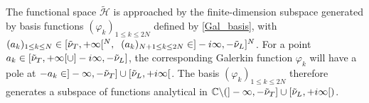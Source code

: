 The functional space $\tilde{\mathcal{H}}$ is approached by the finite-dimension subspace generated by basis functions $(\varphi_k)_{1 \leq k \leq 2N}$ defined by \eqref{Gal_basis}, with $(a_k)_{1 \leq k \leq N} \in \lbrack \tilde{\nu}_T, + \infty \lbrack^N ,\; \; (a_k)_{N+1\leq k \leq 2N} \in \rbrack -i\infty, -\tilde{\nu}_L\rbrack^N$. For a point $a_k \in \lbrack \tilde{\nu}_T, + \infty \lbrack \cup \rbrack -i\infty, -\tilde{\nu}_L\rbrack$, the corresponding Galerkin function $\varphi_k$ will have a pole at $-a_k \in \rbrack-\infty,-\tilde{\nu}_T\rbrack \cup \lbrack \tilde{\nu}_L,+i\infty\lbrack$. The basis $(\varphi_k)_{1 \leq k \leq 2N}$ therefore generates a subspace of functions analytical in $\mathbb{C} \backslash ( \rbrack-\infty,-\tilde{\nu}_T\rbrack \cup \lbrack \tilde{\nu}_L,+i\infty\lbrack)$. %

